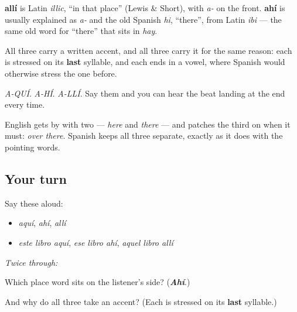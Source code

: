 \begin{cousinweb}
\textbf{allí} is Latin \emph{illic}, \textquotedblleft{}in that place\textquotedblright{} (Lewis \& Short), with \emph{a-} on the front. \textbf{ahí} is usually explained as \emph{a-} and the old Spanish \emph{hi}, \textquotedblleft{}there\textquotedblright{}, from Latin \emph{ibi} — the same old word for \textquotedblleft{}there\textquotedblright{} that sits in \emph{hay}.
\end{cousinweb}

\begin{culture}
All three carry a written accent, and all three carry it for the same reason: each is stressed on its \textbf{last} syllable, and each ends in a vowel, where Spanish would otherwise stress the one before.

\emph{A-QUÍ}. \emph{A-HÍ}. \emph{A-LLÍ}. Say them and you can hear the beat landing at the end every time.

English gets by with two — \emph{here} and \emph{there} — and patches the third on when it must: \emph{over there}. Spanish keeps all three separate, exactly as it does with the pointing words.
\end{culture}

\subsection*{Your turn}
Say these aloud:

\begin{itemize}
\raggedright
  \item \emph{aquí}, \emph{ahí}, \emph{allí}
  \item \emph{este libro aquí}, \emph{ese libro ahí}, \emph{aquel libro allí}
\end{itemize}

\emph{Twice through:}

\begin{tcolorbox}[breakable,colback=teal!4,colframe=teal!35!black,title={Before you move on}]
Which place word sits on the listener's side? (\emph{\textbf{Ahí}}.)

And why do all three take an accent? (Each is stressed on its \textbf{last} syllable.)
\end{tcolorbox}
